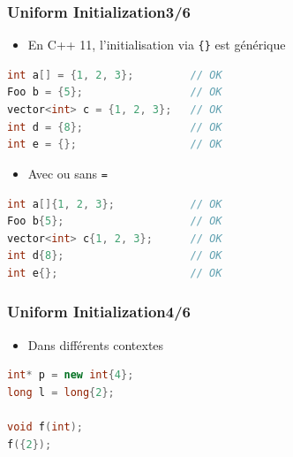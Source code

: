 \documentclass[C++.tex]{subfiles}
\begin{document}
\begin{frame}[fragile]
	\frametitle{Uniform Initialization\titlehfill{}3/6}
	\begin{itemize}
		\item En C++ 11, l'initialisation via \lstinline|{}| est générique
	\end{itemize}

	\begin{lstlisting}[language=C++]
int a[] = {1, 2, 3};         // OK
Foo b = {5};                 // OK
vector<int> c = {1, 2, 3};   // OK
int d = {8};                 // OK
int e = {};                  // OK\end{lstlisting}

	\pause

	\begin{itemize}
		\item Avec ou sans \lstinline|=|
	\end{itemize}

	\begin{lstlisting}[language=C++]
int a[]{1, 2, 3};            // OK
Foo b{5};                    // OK
vector<int> c{1, 2, 3};      // OK
int d{8};                    // OK
int e{};                     // OK\end{lstlisting}
\end{frame}

\begin{frame}[fragile]
	\frametitle{Uniform Initialization\titlehfill{}4/6}
	\begin{itemize}
		\item Dans différents contextes
	\end{itemize}

	\begin{lstlisting}[language=C++]
int* p = new int{4};
long l = long{2};

void f(int);
f({2});\end{lstlisting}
\end{frame}
\end{document}

